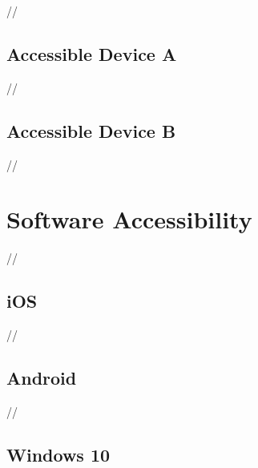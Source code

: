 //


\subsection{Accessible Device A}


//


\subsection{Accessible Device B}


//


\section{Software Accessibility}

//


\subsection{iOS}

//


\subsection{Android}

//


\subsection{Windows 10}

